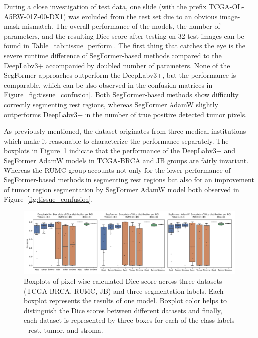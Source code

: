 During a close investigation of test data, one slide (with the prefix TCGA-OL-A5RW-01Z-00-DX1)
was excluded from the test set due to an obvious image-mask mismatch. The overall
performance of the models, the number of parameters, and the resulting Dice score after testing on 
32 test images can be found in Table~\ref*{tab:tissue_perform}. The first thing that catches the eye is the severe runtime difference of
SegFormer-based methods compared to the DeepLabv3+ accompanied by doubled number of parameters.
None of the SegFormer approaches outperform the DeepLabv3+, but the performance
is comparable, which can be also observed in the confusion matrices in Figure~\ref*{fig:tissue_confusion}.
Both SegFormer-based methods show difficulty correctly segmenting rest regions, whereas
SegFormer AdamW slightly outperforms DeepLabv3+ in the number of true positive detected tumor pixels.

As previously mentioned, the dataset originates from three medical
institutions which make it reasonable to characterize the performance separately.
The boxplots in Figure~\ref*{fig:tissue_dice_boxplots} indicate that the performance of
the DeepLabv3+ and SegFormer AdamW models in TCGA-BRCA and JB groups are fairly invariant.
Whereas the RUMC group accounts not only for the lower performance of SegFormer-based methods
in segmenting rest regions but also for an improvement of tumor region segmentation by SegFormer AdamW
model both observed in Figure~\ref*{fig:tissue_confusion}.

\begin{figure}[H]
    \includegraphics[width=\linewidth]{figures/tissue/dice.png}
    \caption{Boxplots of pixel-wise calculated Dice score across three datasets (TCGA-BRCA, RUMC, JB) and three segmentation labels.
    Each boxplot represents the results of one model. Boxplot color helps to distinguish the Dice scores
    between different datasets and finally, each dataset is represented by three boxes for each of the class labels - rest, tumor, and stroma. }
    \label{fig:tissue_dice_boxplots}
\end{figure} 

